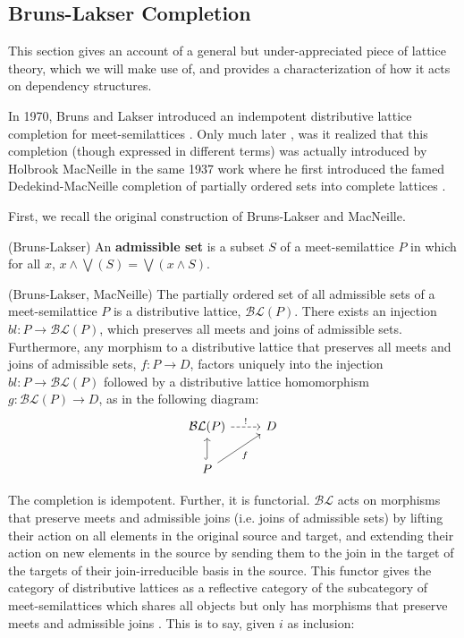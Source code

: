 \documentclass[a4paper,USenglish,cleveref, autoref, thm-restate,authorcolumns]{lipics-v2019}
\newcommand{\BLc}{\mathcal{BL}}
\begin{document}
\subsection{Bruns-Lakser Completion}

This section gives an account of a general but under-appreciated piece of lattice theory, which we will make use of, and provides a characterization of how it acts on dependency structures.

In 1970, Bruns and Lakser introduced an indempotent distributive lattice completion for meet-semilattices \cite{bruns1970injective}. Only much later \cite{ball2016dedekind}, was it realized that this completion (though expressed in different terms) was actually introduced by  Holbrook MacNeille in the same 1937 work where he first introduced the famed Dedekind-MacNeille completion of partially ordered sets into complete lattices \cite{macneille1937partially}. 

First, we recall the original construction of Bruns-Lakser and MacNeille.

\begin{definition}
(Bruns-Lakser) An \textbf{admissible set} is a subset \(S\) of a meet-semilattice \(P\) in which for all \(x\), \(x \wedge \bigvee(S) = \bigvee(x \wedge S)\).
\end{definition}

\begin{theorem}
(Bruns-Lakser, MacNeille) The partially ordered set of all admissible sets of a meet-semilattice \(P\) is a distributive lattice, \(\BLc(P)\). There exists an injection \(bl : P \rightarrow \BLc(P)\), which preserves all meets and joins of admissible sets. Furthermore, any morphism to a distributive lattice that preserves all meets and joins of admissible sets, \(f : P \rightarrow D\), factors uniquely into the injection \(bl : P \rightarrow \BLc(P)\) followed by a distributive lattice homomorphism \(g : \BLc(P) \rightarrow D\), as in the following diagram:
\begin{equation*}
\begin{tikzcd}
\BLc(P) \arrow[r, "!",dashed]            & D \\
P \arrow[u, hook] \arrow[ru, "f"'] &
\end{tikzcd}
\end{equation*}

\end{theorem}

The completion is idempotent. Further, it is functorial. \(\BLc\) acts on morphisms that preserve meets and admissible joins (i.e. joins of admissible sets) by lifting their action on all elements in the original source and target, and extending their action on new elements in the source by sending them to the join in the target of the targets of their join-irreducible basis in the source. This functor gives the category of distributive lattices as a reflective category of the subcategory of meet-semilattices which shares all objects but only has morphisms that preserve meets and admissible joins \cite{gehrke2014distributive}. This is to say, given \(i\) as inclusion:
\end{document}

